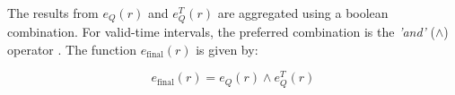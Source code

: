 The results from $e_Q(r)$ and $e_Q^{T}(r)$ are aggregated using a boolean combination. For valid-time intervals, the preferred combination is the \emph{'and'} ($\wedge$) operator . The function $e_{\mbox{final}}\left(r\right)$ is given by:

\begin{equation}
 \label{eq:e-final-crisp}
e_{\mbox{final}}\left(r\right) = e_Q(r) \wedge e_Q^{T}(r)
\end{equation}




% 
% 




